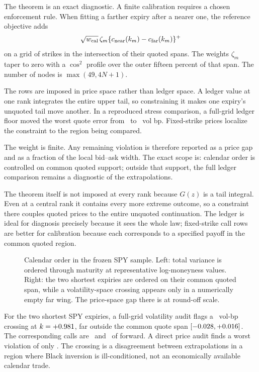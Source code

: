 The theorem is an exact diagnostic.  A finite calibration requires a chosen
enforcement rule.  When fitting a farther expiry after a nearer one, the
reference objective adds
\begin{equation}
\sqrt{w_{\rm cal}}\,\zeta_m
\{c_{\rm near}(k_m)-c_{\rm far}(k_m)\}^+
\label{eq:calrows}
\end{equation}
on a grid of strikes in the intersection of their quoted spans.  The weights
$\zeta_m$ taper to zero with a $\cos^2$ profile over the outer fifteen percent
of that span.  The number of nodes is $\max(49,4N+1)$.

The rows are imposed in price space rather than ledger space.  A ledger value
at one rank integrates the entire upper tail, so constraining it makes one
expiry's unquoted tail move another.  In a reproduced stress comparison, a
full-grid ledger floor moved the worst quote error from
\MacPhantomDragFromBp\ to \MacPhantomDragToBp\ vol bp.  Fixed-strike prices
localize the constraint to the region being compared.

The weight is finite.  Any remaining violation is therefore reported as a
price gap and as a fraction of the local bid--ask width.  The exact scope is:
calendar order is controlled on common quoted support; outside that support,
the full ledger comparison remains a diagnostic of the extrapolations.

The theorem itself is not imposed at every rank because $G(z)$ is a tail
integral.  Even at a central rank it contains every more extreme outcome, so
a constraint there couples quoted prices to the entire unquoted continuation.
The ledger is ideal for diagnosis precisely because it sees the whole law;
fixed-strike call rows are better for calibration because each corresponds to
a specified payoff in the common quoted region.

\begin{figure}[htbp]
\centering
{}
\caption{Calendar order in the frozen SPY sample.  Left: total variance is
ordered through maturity at representative log-moneyness values.  Right: the
two shortest expiries are ordered on their common quoted span, while a
volatility-space crossing appears only in a numerically empty far wing.  The
price-space gap there is at round-off scale.}
\label{fig:calendar}
\end{figure}

For the two shortest SPY expiries, a full-grid volatility audit flags a
\MacCalGapVolBp\ vol-bp crossing at $k=+0.981$, far outside the
common quote span $[-0.028,+0.016]$.  The corresponding calls
are \MacCalendarCallShort\ and \MacCalendarCallLong\ of forward.  A direct
price audit finds a worst violation of only \MacCalPriceGridWorst.  The
crossing is a disagreement between extrapolations in a region where Black
inversion is ill-conditioned, not an economically available calendar trade.
